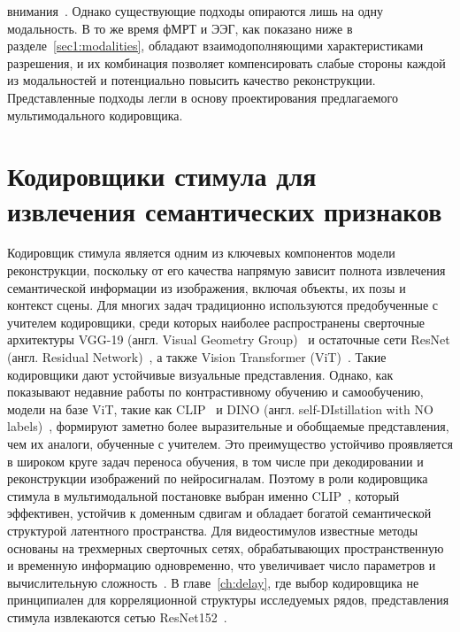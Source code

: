 внимания~\cite{li2024visual}. Однако существующие подходы опираются лишь на одну модальность. В то же время фМРТ и ЭЭГ, как показано ниже в разделе~\ref{sec1:modalities}, обладают взаимодополняющими характеристиками разрешения, и их комбинация позволяет компенсировать слабые стороны каждой из модальностей и потенциально повысить качество реконструкции. Представленные подходы легли в основу проектирования предлагаемого мультимодального кодировщика.

\section{Кодировщики стимула для извлечения семантических признаков}\label{sec1:visual}

Кодировщик стимула является одним из ключевых компонентов модели реконструкции, поскольку от его качества напрямую зависит полнота извлечения семантической информации из изображения, включая объекты, их позы и контекст сцены. Для многих задач традиционно используются предобученные с учителем кодировщики, среди которых наиболее распространены сверточные архитектуры VGG-19 (англ. Visual Geometry Group)~\cite{simonyan2015deepconvolutionalnetworkslargescale} и остаточные сети ResNet (англ. Residual Network)~\cite{he2015deep}, а также Vision Transformer (ViT)~\cite{dosovitskiy2021imageworth16x16words}. Такие кодировщики дают устойчивые визуальные представления. Однако, как показывают недавние работы по контрастивному обучению и самообучению, модели на базе ViT, такие как CLIP~\cite{radford2021learning} и DINO (англ. self-DIstillation with NO labels)~\cite{caron2021emergingpropertiesselfsupervisedvision}, формируют заметно более выразительные и обобщаемые представления, чем их аналоги, обученные с учителем. Это преимущество устойчиво проявляется в широком круге задач переноса обучения, в том числе при декодировании и реконструкции изображений по нейросигналам. Поэтому в роли кодировщика стимула в мультимодальной постановке выбран именно CLIP~\cite{radford2021learning}, который эффективен, устойчив к доменным сдвигам и обладает богатой семантической структурой латентного пространства. Для видеостимулов известные методы основаны на трехмерных сверточных сетях, обрабатывающих пространственную и временную информацию одновременно, что увеличивает число параметров и вычислительную сложность~\cite{tran2015learning}. В главе~\ref{ch:delay}, где выбор кодировщика не принципиален для корреляционной структуры исследуемых рядов, представления стимула извлекаются сетью ResNet152~\cite{he2015deep}.

